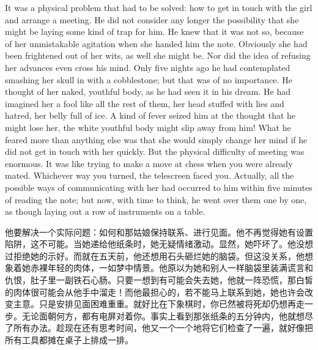 \begin{paracol}{2}
\switchcolumn*

It was a physical problem that had to be solved: how to get in touch
with the girl and arrange a meeting. He did not consider any longer the
possibility that she might be laying some kind of trap for him. He knew
that it was not so, because of her unmistakable agitation when she
handed him the note. Obviously she had been frightened out of her wits,
as well she might be. Nor did the idea of refusing her advances even
cross his mind. Only five nights ago he had contemplated smashing her
skull in with a cobblestone; but that was of no importance. He thought
of her naked, youthful body, as he had seen it in his dream. He had
imagined her a fool like all the rest of them, her head stuffed with
lies and hatred, her belly full of ice. A kind of fever seized him at
the thought that he might lose her, the white youthful body might slip
away from him! What he feared more than anything else was that she would
simply change her mind if he did not get in touch with her quickly. But
the physical difficulty of meeting was enormous. It was like trying to
make a move at chess when you were already mated. Whichever way you
turned, the telescreen faced you. Actually, all the possible ways of
communicating with her had occurred to him within five minutes of
reading the note; but now, with time to think, he went over them one by
one, as though laying out a row of instruments on a table.

\switchcolumn

他要解决一个实际问题：如何和那姑娘保持联系、进行见面。他不再觉得她有设置陷阱，这不可能。当她递给他纸条时，她无疑情绪激动。显然，她吓坏了。他没想过拒绝她的示好。而就在五天前，他还想用石头砸烂她的脑袋。但这没关系，他想象着她赤裸年轻的肉体，一如梦中情景。他原以为她和别人一样脑袋里装满谎言和仇恨，肚子里一副铁石心肠。只要一想到有可能会失去她，他就一阵恐慌，那白皙的肉体很可能会从他手中溜走！而他最担心的，若不能马上联系到她，她也许会改变主意。只是安排见面困难重重。就好比在下象棋时，你已然被将死却仍想再走一步。无论面朝何方，都有电屏对着你。事实上看到那张纸条的五分钟内，他就想尽了所有办法。趁现在还有思考时间，他又一个一个地将它们检查了一遍，就好像把所有工具都摊在桌子上排成一排。

\switchcolumn*


\end{paracol}
